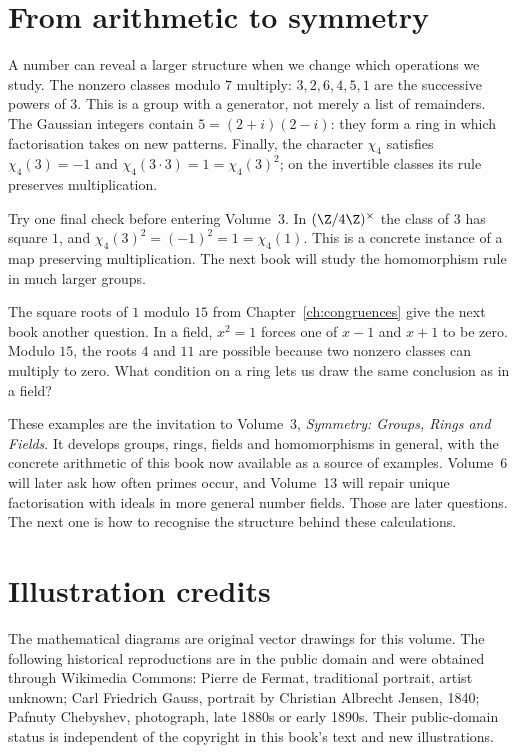 \section*{From arithmetic to symmetry}
A number can reveal a larger structure when we change which operations
we study. The nonzero classes modulo $7$ multiply: $3,2,6,4,5,1$ are
the successive powers of $3$. This is a group with a generator, not
merely a list of remainders. The Gaussian integers contain $5=(2+i)(2-i)$:
they form a ring in which factorisation takes on new patterns. Finally,
the character $\chi_4$ satisfies $\chi_4(3)=-1$ and
$\chi_4(3\cdot3)=1=\chi_4(3)^2$; on the invertible classes its rule
preserves multiplication.

Try one final check before entering Volume~3. In $(\Z/4\Z)^\times$ the class of $3$ has square $1$, and $\chi_4(3)^2=(-1)^2=1=\chi_4(1)$. This is a concrete instance of a map preserving multiplication. The next book will study the homomorphism rule in much larger groups.

The square roots of $1$ modulo $15$ from Chapter~\ref{ch:congruences} give the next book another question. In a field, $x^2=1$ forces one of $x-1$ and $x+1$ to be zero. Modulo $15$, the roots $4$ and $11$ are possible because two nonzero classes can multiply to zero. What condition on a ring lets us draw the same conclusion as in a field?

These examples are the invitation to Volume~3,
\emph{Symmetry: Groups, Rings and Fields}. It develops groups, rings, fields and homomorphisms in
general, with the concrete arithmetic of this book now available as a
source of examples. Volume~6 will later ask how often primes occur, and
Volume~13 will repair unique factorisation with ideals in more general
number fields. Those are later questions. The next one is how to
recognise the structure behind these calculations.

\section*{Illustration credits}
The mathematical diagrams are original vector drawings for this volume. The following historical reproductions
are in the public domain and were obtained through Wikimedia Commons: Pierre de Fermat,
traditional portrait, artist unknown; Carl Friedrich Gauss, portrait by Christian Albrecht Jensen, 1840;
Pafnuty Chebyshev, photograph, late 1880s or early 1890s.
Their public-domain status is independent of the copyright in this book's text and new illustrations.
